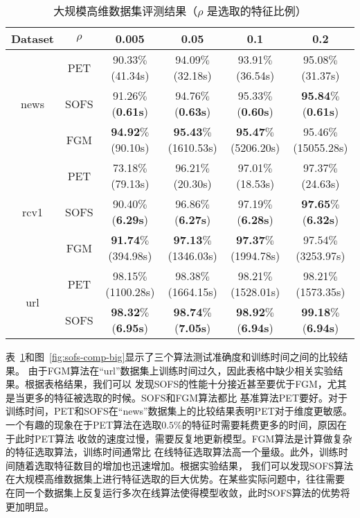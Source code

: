 \documentclass[doctor]{ustcthesis}
\begin{document}
\begin{table}[htpb]
    \centering
    \caption{大规模高维数据集评测结果（$\rho$ 是选取的特征比例）}
    \label{tbl:sofs-comp-big}
    \footnotesize
    \begin{tabular}{|c|c|c|c|c|c|}
        \hline
        Dataset & $\rho$ & 0.005 & 0.05 & 0.1 & 0.2\\\hline
        \multirow{3}{*}{news}& PET & 90.33$\%$(41.34s) & 94.09$\%$(32.18s) &
        93.91$\%$(36.54s) & 95.08$\%$(31.37s) \\
        &SOFS &  91.26$\%$(\textbf{0.61s}) & 94.76$\%$(\textbf{0.63s})  &
        95.33$\%$(\textbf{0.60s})  & \textbf{95.84}$\%$(\textbf{0.61s})\\
        &FGM  & \textbf{94.92}$\%$(90.10s)&
        \textbf{95.43}$\%$(1610.53s) & \textbf{95.47}$\%$(5206.20s) &
        95.46$\%$(15055.28s)\\\hline
        \multirow{3}{*}{rcv1} & PET & 73.18$\%$(79.13s)& 96.21$\%$(20.30s)&
        97.01$\%$(18.53s) & 97.37$\%$(24.63s)\\
        &SOFS & 90.40$\%$(\textbf{6.29s}) & 96.86$\%$(\textbf{6.27s}) &
        97.19$\%$(\textbf{6.28s}) & \textbf{97.65}$\%$(\textbf{6.32s})\\
        &FGM & \textbf{91.74}$\%$(394.98s)&
        \textbf{97.13}$\%$(1346.03s) & \textbf{97.37}$\%$(1994.78s)&
        97.54$\%$(3253.97s)\\\hline
        \multirow{2}{*}{url} & PET &  98.15$\%$(1100.28s)& 98.38$\%$(1664.15s) &
        98.21$\%$(1528.01s) &	98.21$\%$(1573.35s)\\
        &SOFS & \textbf{98.32}$\%$(\textbf{6.95s})  & \textbf{98.74}$\%$(\textbf{7.05s}) &
        \textbf{98.92}$\%$(\textbf{6.94s}) & \textbf{99.18}$\%$(\textbf{6.94s}) \\
        \hline
    \end{tabular}
\end{table}
表~\ref{tbl:sofs-comp-big}和图~\ref{fig:sofs-comp-big}显示了三个算法测试准确度和训练时间之间的比较结果。
由于FGM算法在``url''数据集上训练时间过久，因此表格中缺少相关实验结果。根据表格结果，我们可以
发现SOFS的性能十分接近甚至要优于FGM，尤其是当更多的特征被选取的时候。SOFS和FGM算法都比
基准算法PET要好。对于训练时间，PET和SOFS在``news''数据集上的比较结果表明PET对于维度更敏感。
一个有趣的现象在于PET算法在选取$0.5\%$的特征时需要耗费更多的时间，原因在于此时PET算法
收敛的速度过慢，需要反复地更新模型。FGM算法是计算做复杂的特征选取算法，训练时间通常比
在线特征选取算法高一个量级。此外，训练时间随着选取特征数目的增加也迅速增加。根据实验结果，
我们可以发现SOFS算法在大规模高维数据集上进行特征选取的巨大优势。在某些实际问题中，往往需要
在同一个数据集上反复运行多次在线算法使得模型收敛，此时SOFS算法的优势将更加明显。
\end{document}
